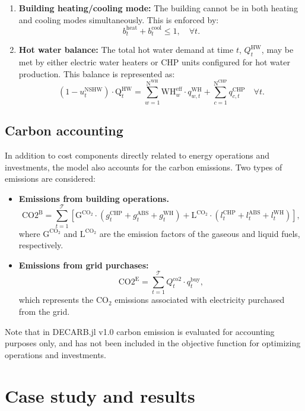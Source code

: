 \documentclass[11pt]{article}
\begin{document}
\begin{enumerate}
    \[
    Q_{\text{IHG},t} = Q_{\text{L}, t} + Q_{\text{E},t} +Q_{\text{H},t}
    \]

    \item \textbf{Building heating/cooling mode:}
    The building cannot be in both heating and cooling modes simultaneously. This is enforced by:
    \[
    b^\text{heat}_t + b^\text{cool}_t \leq 1, \quad \forall t.
    \]

    \item \textbf{Hot water balance:}
    The total hot water demand at time \(t\), \(Q^\text{HW}_t\), may be met by either electric water heaters or CHP units configured for hot water production. This balance is represented as:
    \[
    (1 - u^\text{NSHW}_t) \cdot \text{Q}^\text{HW}_t = \sum_{w=1}^{\text{N}^\text{WH}} \text{WH}^\text{eff}_w \cdot q^\text{WH}_{w,t} + \sum_{c=1}^{\text{N}^\text{CHP}} q^\text{CHP}_{c,t} \quad \forall t.
    \]
\end{enumerate}

\subsection{Carbon accounting}

In addition to cost components directly related to energy operations and investments, the model also accounts for the carbon emissions. Two types of emissions are considered:
\begin{itemize}
    \item \textbf{Emissions from building operations.}  
    \[
    \text{CO2}^\text{B} = \sum_{t=1}^{\mathcal{T}} \left[ \text{G}^{\text{CO}_2} \cdot \left( g^\text{CHP}_t + g^\text{ABS}_t + g^\text{WH}_t \right) 
    + \text{L}^{\text{CO}_2} \cdot \left( l^\text{CHP}_t + l^\text{ABS}_t + l^\text{WH}_t \right) \right],
    \]
    where \(\text{G}^{\text{CO}_2}\) and \(\text{L}^{\text{CO}_2}\) are the emission factors of the gaseous and liquid fuels, respectively.
    \item \textbf{Emissions from grid purchases:}  
    \[
    \text{CO2}^\text{E} = \sum_{t=1}^{\mathcal{T}} Q^\text{co2}_t \cdot q^\text{buy}_t,
    \]
    which represents the CO\(_2\) emissions associated with electricity purchased from the grid.
\end{itemize}
Note that in DECARB.jl v1.0 carbon emission is evaluated for accounting purposes only, and has not been included in the objective function for optimizing operations and investments.

\section{Case study and results}
\label{sec:case}
\end{document}
